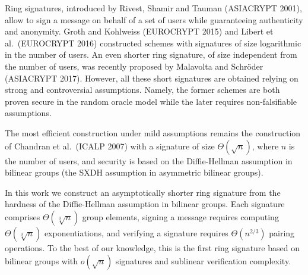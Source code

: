 
Ring signatures, introduced by Rivest, Shamir and Tauman (ASIACRYPT 2001), allow to sign a message on behalf of a set of users while guaranteeing authenticity and anonymity. Groth and Kohlweiss (EUROCRYPT 2015) and Libert et al.~(EUROCRYPT 2016) constructed schemes with signatures of size logarithmic in the number of users. An even shorter ring signature, of size independent from the number of users, was recently proposed by Malavolta and  Schr\"oder (ASIACRYPT 2017).
However, all these short signatures are obtained relying on strong and controversial assumptions. Namely, the former schemes are both proven secure in the random oracle model while the later requires non-falsifiable assumptions.

The most efficient construction under mild assumptions remains the construction of Chandran et al.~(ICALP 2007) with a signature of size $\Theta(\sqrt{n})$, where $n$ is the number of users, and security is based on the Diffie-Hellman assumption in bilinear groups (the SXDH assumption in asymmetric bilinear groups).

In this work we construct an asymptotically shorter ring signature from the hardness of the Diffie-Hellman assumption in bilinear groups.
 Each signature comprises $\Theta(\sqrt[3]{n})$ group elements, signing a message requires computing $\Theta(\sqrt[3]{n})$ exponentiations, and verifying a signature requires $\Theta(n^{2/3})$ pairing operations. To the best of our knowledge, this is the first ring signature based on bilinear groups with $o(\sqrt{n})$ signatures and sublinear verification complexity.
